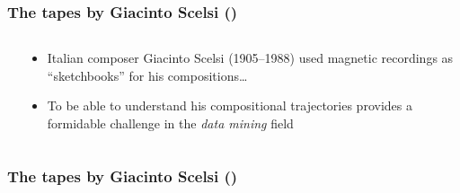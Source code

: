 \setcounter{ms}{0}
\begin{frame}
    \frametitle<+- | alert@+->{The tapes by Giacinto Scelsi ()}
    
    \begin{columns}[T]
        \begin{column}{0.3\textwidth}
        \end{column}
        \begin{column}{0.7\textwidth}
            \begin{itemize}[<+- | alert@+->]
								\item Italian composer Giacinto Scelsi (1905--1988)
												used magnetic recordings as ``sketchbooks''
												for his compositions\ldots
								\item To be able to understand his compositional trajectories 
												provides a formidable challenge in the \emph{data
												mining} field
            \end{itemize}
        \end{column}
    \end{columns}

\end{frame}

\begin{frame}
    \frametitle{The tapes by Giacinto Scelsi ()}
    
    \begin{center}
    \end{center}

\end{frame}

